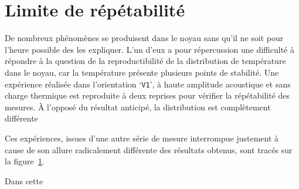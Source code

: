 \section{Limite de répétabilité}

De nombreux phénomènes se produisent dans le noyau sans qu'il ne soit pour l'heure possible des les expliquer. L'un d'eux a pour répercussion une difficulté à répondre à la question de la reproductibilité de la distribution de température dans le noyau, car la température présente plusieurs points de stabilité. Une expérience réalisée dans l'orientation `\texttt{V1}', à haute amplitude acoustique et sans charge thermique est reproduite à deux reprises pour vérifier la répétabilité des mesures. À l'opposé du résultat anticipé, la distribution est complètement différente   

Ces expériences, issues d'une autre série de mesure interrompue justement à cause de son allure radicalement différente des résultats obtenus, sont tracés sur la figure~\ref{fig:Repetabilite_V1}.

\begin{figure}[!ht]
    \centering
    
    \caption{}
    \label{fig:Repetabilite_V1}
\end{figure}

Dans cette


